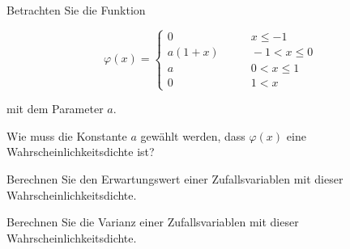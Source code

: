 Betrachten Sie die Funktion
\begin{center}
\begin{minipage}{0.45\hsize}
\[
\varphi(x)
=
\begin{cases}
0     &\qquad x \le -1 \\
a(1+x)&\qquad -1<x\le 0\\
a     &\qquad 0<x\le 1\\
0     &\qquad 1< x
\end{cases}
\]
\end{minipage}
\qquad
\begin{minipage}{0.45\hsize}
\end{minipage}
\end{center}
mit dem Parameter $a$.
\begin{teilaufgaben}
\item
Wie muss die Konstante $a$ gewählt werden, dass $\varphi(x)$ eine
Wahrscheinlichkeitsdichte ist?
\item
Berechnen Sie den Erwartungswert einer Zufallsvariablen mit dieser
Wahr\-schein\-lichkeits\-dichte.
\item
Berechnen Sie die Varianz einer Zufallsvariablen mit dieser
Wahrscheinlichkeitsdichte.
\end{teilaufgaben}


